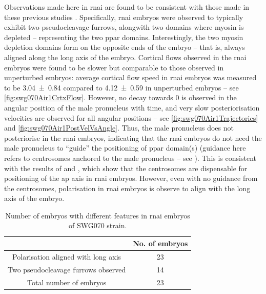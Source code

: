Observations made here in  \ac{rnai} are found to be consistent with those made in these previous studies \citep{klinkert2019aurora,kapoor2019centrosome}. Specifically,  \ac{rnai} embryos were observed to typically exhibit two pseudocleavage furrows, alongwith two domains where myosin is depleted -- representing the two \ac{ppar} domains. Interestingly, the two myosin depletion domains form on the opposite ends of the embryo -- that is, always aligned along the long axis of the embryo. Cortical flows observed in the \ac{rnai} embryos were found to be slower but comparable to those observed in unperturbed embryos: average cortical flow speed in \ac{rnai} embryos was measured to be \SI{3.04 +- 0.84}{\unitCrtxVel} compared to \SI{4.12 +- 0.59}{\unitCrtxVel} in unperturbed embryos -- see \autoref{fig:swg070Air1CrtxFlow}. However, no decay towards \SI{0}{\unitAngle} is observed in the angular position of the male pronucleus with time, and very slow posteriorisation velocities are observed for all angular positions -- see \autoref{fig:swg070Air1Trajectories} and \autoref{fig:swg070Air1PostVelVsAngle}. Thus, the male pronucleus does not posteriorise in the  \ac{rnai} embryos, indicating that the \ac{rnai} embryos do not need the male pronucleus to \enquote{guide} the positioning of \ac{ppar} domain(s) (guidance here refers to centrosomes anchored to the male pronucleus -- see \cite{gross2019guiding}). This is consistent with the results of \cite{klinkert2019aurora} and \cite{kapoor2019centrosome}, which show that the centrosomes are dispensable for positioning of the \ac{ap} axis in  \ac{rnai} embryos. However, even with no guidance from the centrosomes, polarisation in  \ac{rnai} embryos is observe to  align with the long axis of the embryo.

\begin{table}
    \centering
    \begin{tabular}{|c|c|}
        \hline
         & No. of embryos \\
         \hline
         Polarisation aligned with long axis & \num{23}\\
         Two pseudocleavage furrows observed & \num{14}\\
         Total number of embryos & \num{23}\\
         \hline
    \end{tabular}
    \caption{Number of embryos with different features in  \ac{rnai} embryos of SWG070 strain.}
    \label{tab:apAxisAlignmentAir1}
\end{table}

